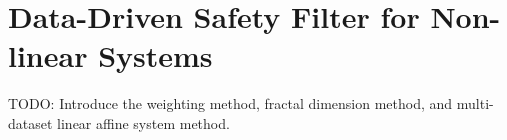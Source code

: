 \chapter{Data-Driven Safety Filter for Non-linear Systems}\label{chap:non-linear-system}
TODO: Introduce the weighting method, fractal dimension method, and multi-dataset linear affine system method.